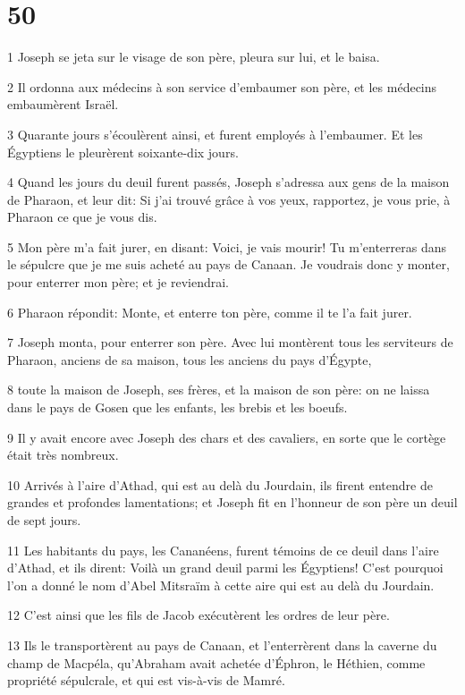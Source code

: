 \chapter{50}

\par 1 Joseph se jeta sur le visage de son père, pleura sur lui, et le baisa.
\par 2 Il ordonna aux médecins à son service d'embaumer son père, et les médecins embaumèrent Israël.
\par 3 Quarante jours s'écoulèrent ainsi, et furent employés à l'embaumer. Et les Égyptiens le pleurèrent soixante-dix jours.
\par 4 Quand les jours du deuil furent passés, Joseph s'adressa aux gens de la maison de Pharaon, et leur dit: Si j'ai trouvé grâce à vos yeux, rapportez, je vous prie, à Pharaon ce que je vous dis.
\par 5 Mon père m'a fait jurer, en disant: Voici, je vais mourir! Tu m'enterreras dans le sépulcre que je me suis acheté au pays de Canaan. Je voudrais donc y monter, pour enterrer mon père; et je reviendrai.
\par 6 Pharaon répondit: Monte, et enterre ton père, comme il te l'a fait jurer.
\par 7 Joseph monta, pour enterrer son père. Avec lui montèrent tous les serviteurs de Pharaon, anciens de sa maison, tous les anciens du pays d'Égypte,
\par 8 toute la maison de Joseph, ses frères, et la maison de son père: on ne laissa dans le pays de Gosen que les enfants, les brebis et les boeufs.
\par 9 Il y avait encore avec Joseph des chars et des cavaliers, en sorte que le cortège était très nombreux.
\par 10 Arrivés à l'aire d'Athad, qui est au delà du Jourdain, ils firent entendre de grandes et profondes lamentations; et Joseph fit en l'honneur de son père un deuil de sept jours.
\par 11 Les habitants du pays, les Cananéens, furent témoins de ce deuil dans l'aire d'Athad, et ils dirent: Voilà un grand deuil parmi les Égyptiens! C'est pourquoi l'on a donné le nom d'Abel Mitsraïm à cette aire qui est au delà du Jourdain.
\par 12 C'est ainsi que les fils de Jacob exécutèrent les ordres de leur père.
\par 13 Ils le transportèrent au pays de Canaan, et l'enterrèrent dans la caverne du champ de Macpéla, qu'Abraham avait achetée d'Éphron, le Héthien, comme propriété sépulcrale, et qui est vis-à-vis de Mamré.
